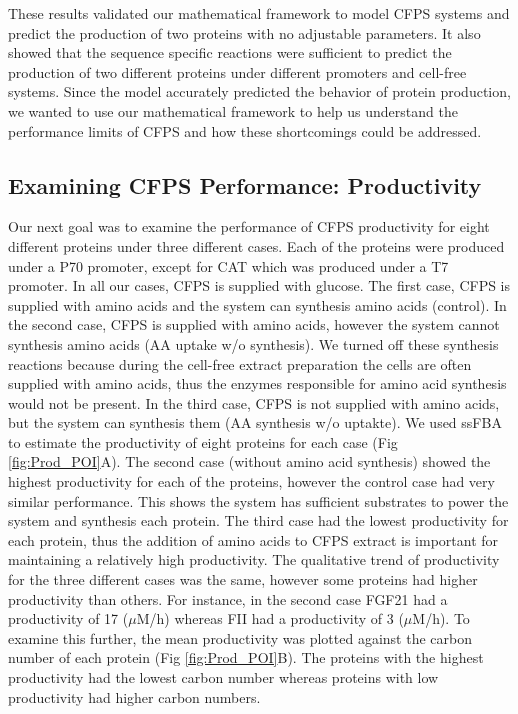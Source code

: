 \documentclass[journal=asbcd6,manuscript=article]{achemso}
\begin{document}
These results validated our mathematical framework to model CFPS systems and predict the production of two proteins with no adjustable parameters. 
It also showed that the sequence specific reactions were sufficient to predict the production of two different proteins under different promoters and cell-free systems. 
Since the model accurately predicted the behavior of protein production, we wanted to use our mathematical framework to help us understand the performance limits of CFPS and how these shortcomings could be addressed. 

\subsection{Examining CFPS Performance: Productivity}
Our next goal was to examine the performance of CFPS productivity for eight different proteins under three different cases. Each of the proteins were produced under a P70 promoter, except for CAT which was produced under a T7 promoter. In all our cases, CFPS is supplied with glucose. The first case, CFPS is supplied with amino acids and the system can synthesis amino acids (control). In the second case, CFPS is supplied with amino acids, however the system cannot synthesis amino acids (AA uptake w/o synthesis). We turned off these synthesis reactions because during the cell-free extract preparation the cells are often supplied with amino acids, thus the enzymes responsible for amino acid synthesis would not be present. In the third case, CFPS is not supplied with amino acids, but the system can synthesis them (AA synthesis w/o uptakte).    
We used ssFBA to estimate the productivity of eight proteins for each case (Fig \ref{fig:Prod_POI}A).
The second case (without amino acid synthesis) showed the highest productivity for each of the proteins, however the control case had very similar performance.
This shows the system has sufficient substrates to power the system and synthesis each protein. 
The third case had the lowest productivity for each protein, thus the addition of amino acids to CFPS extract is important for maintaining a relatively high productivity.
The qualitative trend of productivity for the three different cases was the same, however some proteins had higher productivity than others. 
For instance, in the second case FGF21 had a productivity of 17 ($\mu$M/h) whereas FII had a productivity of 3 ($\mu$M/h).
To examine this further, the mean productivity was plotted against the carbon number of each protein (Fig \ref{fig:Prod_POI}B).
The proteins with the highest productivity had the lowest carbon number whereas proteins with low productivity had higher carbon numbers.     
\end{document}
